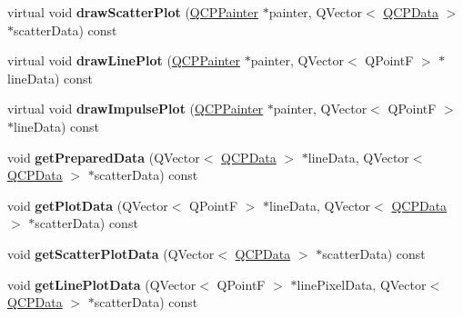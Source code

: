 \begin{DoxyCompactItemize}
\item 
\hypertarget{classQCPGraph_a6bdc385b122ce06134d4196373ae2250}{virtual void {\bfseries draw\-Scatter\-Plot} (\hyperlink{classQCPPainter}{\-Q\-C\-P\-Painter} $\ast$painter, \-Q\-Vector$<$ \hyperlink{classQCPData}{\-Q\-C\-P\-Data} $>$ $\ast$scatter\-Data) const }\label{classQCPGraph_a6bdc385b122ce06134d4196373ae2250}

\item 
\hypertarget{classQCPGraph_acebc22c3385829b19a87e6281fe6ade2}{virtual void {\bfseries draw\-Line\-Plot} (\hyperlink{classQCPPainter}{\-Q\-C\-P\-Painter} $\ast$painter, \-Q\-Vector$<$ \-Q\-Point\-F $>$ $\ast$line\-Data) const }\label{classQCPGraph_acebc22c3385829b19a87e6281fe6ade2}

\item 
\hypertarget{classQCPGraph_abc01180629621f1e47e94559227d3d8c}{virtual void {\bfseries draw\-Impulse\-Plot} (\hyperlink{classQCPPainter}{\-Q\-C\-P\-Painter} $\ast$painter, \-Q\-Vector$<$ \-Q\-Point\-F $>$ $\ast$line\-Data) const }\label{classQCPGraph_abc01180629621f1e47e94559227d3d8c}

\item 
\hypertarget{classQCPGraph_ab420b46ba638dc3252439fe16687b244}{void {\bfseries get\-Prepared\-Data} (\-Q\-Vector$<$ \hyperlink{classQCPData}{\-Q\-C\-P\-Data} $>$ $\ast$line\-Data, \-Q\-Vector$<$ \hyperlink{classQCPData}{\-Q\-C\-P\-Data} $>$ $\ast$scatter\-Data) const }\label{classQCPGraph_ab420b46ba638dc3252439fe16687b244}

\item 
\hypertarget{classQCPGraph_a466c661e015188971c862031af946693}{void {\bfseries get\-Plot\-Data} (\-Q\-Vector$<$ \-Q\-Point\-F $>$ $\ast$line\-Data, \-Q\-Vector$<$ \hyperlink{classQCPData}{\-Q\-C\-P\-Data} $>$ $\ast$scatter\-Data) const }\label{classQCPGraph_a466c661e015188971c862031af946693}

\item 
\hypertarget{classQCPGraph_a45c4214b59ea11aa6d8d112bdc3b0e03}{void {\bfseries get\-Scatter\-Plot\-Data} (\-Q\-Vector$<$ \hyperlink{classQCPData}{\-Q\-C\-P\-Data} $>$ $\ast$scatter\-Data) const }\label{classQCPGraph_a45c4214b59ea11aa6d8d112bdc3b0e03}

\item 
\hypertarget{classQCPGraph_ae3d82ffd0c9a883482aabf47b0e6b5ee}{void {\bfseries get\-Line\-Plot\-Data} (\-Q\-Vector$<$ \-Q\-Point\-F $>$ $\ast$line\-Pixel\-Data, \-Q\-Vector$<$ \hyperlink{classQCPData}{\-Q\-C\-P\-Data} $>$ $\ast$scatter\-Data) const }\label{classQCPGraph_ae3d82ffd0c9a883482aabf47b0e6b5ee}


\end{DoxyCompactItemize}
